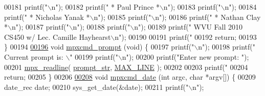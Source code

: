 \begin{DoxyCode}
{{{{{{{{00181         printf(\textcolor{stringliteral}{"\(\backslash\)n"});
00182         printf(\textcolor{stringliteral}{"             *  Paul Prince  *\(\backslash\)n"});
00183         printf(\textcolor{stringliteral}{"\(\backslash\)n"});
00184         printf(\textcolor{stringliteral}{"                     *  Nicholas Yanak  *\(\backslash\)n"});
00185         printf(\textcolor{stringliteral}{"\(\backslash\)n"});
00186         printf(\textcolor{stringliteral}{"                             *  Nathan Clay  *\(\backslash\)n"});
00187         printf(\textcolor{stringliteral}{"\(\backslash\)n"});
00188         printf(\textcolor{stringliteral}{"\(\backslash\)n"});
00189         printf(\textcolor{stringliteral}{"  WVU Fall 2010 CS450 w/ Lec. Camille Hayhearst\(\backslash\)n"});
00190 
00191         printf(\textcolor{stringliteral}{"%
00192         \textcolor{keywordflow}{return};
00193 \}
00194 
\hypertarget{mpx__cmd_8c_source_l00196}{}\hyperlink{mpx__cmd_8h_a0a04805761cf7c183609e1383a4c4975}{00196} \textcolor{keywordtype}{void} \hyperlink{mpx__cmd_8c_a0a04805761cf7c183609e1383a4c4975}{mpxcmd_prompt} (\textcolor{keywordtype}{void}) \{
00197         printf(\textcolor{stringliteral}{"\(\backslash\)n"});
00198         printf(\textcolor{stringliteral}{"  Current prompt is: \(\backslash\)"%
00199         printf(\textcolor{stringliteral}{"\(\backslash\)n"});
00200         printf(\textcolor{stringliteral}{"Enter new prompt: "});
00201         \hyperlink{mpx__util_8c_a781169ab05ad54c0d37253d73060b77f}{mpx_readline}( \hyperlink{mpx__cmd_8c_a4d455760d7d89fa6a1c1559f7b6acdf7}{prompt_str}, \hyperlink{mpx__cmd_8h_a842ed03f27719bc87666bfd1f75415b8}{MAX_LINE} );
00202 
00203         printf(\textcolor{stringliteral}{"%
00204         \textcolor{keywordflow}{return};
00205 \}
00206 
\hypertarget{mpx__cmd_8c_source_l00208}{}\hyperlink{mpx__cmd_8h_a8959742dda38733f33da60a56cb07373}{00208} \textcolor{keywordtype}{void} \hyperlink{mpx__cmd_8c_a8959742dda38733f33da60a56cb07373}{mpxcmd_date} (\textcolor{keywordtype}{int} argc, \textcolor{keywordtype}{char} *argv[]) \{
00209         date\_rec date;
00210         sys\_get\_date(&date);
00211         printf(\textcolor{stringliteral}{"\(\backslash\)n"});
}}}}}}}}}}}
\end{DoxyCode}
